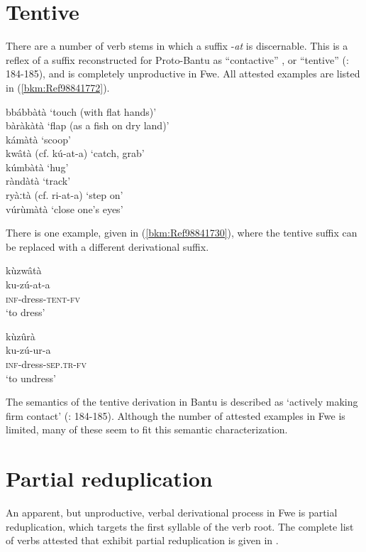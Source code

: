 \section{Tentive}
\label{bkm:Ref485997273}\hypertarget{Toc75352670}{}
There are a number of verb stems in which a suffix -\textit{at} is discernable. This is a reflex of a suffix reconstructed for Proto-Bantu as “contactive” \citep[92]{Meeussen1967}, or “tentive” (\citealt{SchadebergBostoen2019}: 184-185), and is completely unproductive in Fwe. All attested examples are listed in (\ref{bkm:Ref98841772}).

\ea
\label{bkm:Ref98841772}
bbábbàtà \tab ‘touch (with flat hands)’\\
bàràkàtà \tab ‘flap (as a fish on dry land)’\\
kámàtà \tab ‘scoop’\\
kwâtà (cf. kú-at-a) \tab ‘catch, grab’\\
kúmbàtà \tab ‘hug’\\
ràndàtà \tab ‘track’\\
ryàːtà (cf. ri-at-a) \tab ‘step on’\\
vúrùmàtà \tab ‘close one’s eyes’\\
\z


There is one example, given in (\ref{bkm:Ref98841730}), where the tentive suffix can be replaced with a different derivational suffix.

\ea
\label{bkm:Ref98841730}
\glll kùzwâtà\\
ku-zú-at-a\\
\textsc{inf}-dress-\textsc{tent}-\textsc{fv}\\
\glt ‘to dress’
\z

\ea
\glll kùzûrà\\
ku-zú-ur-a\\
\textsc{inf}-dress-\textsc{sep}.\textsc{tr}-\textsc{fv}\\
\glt ‘to undress’
\z

The semantics of the tentive derivation in Bantu is described as ‘actively making firm contact’ (\citealt{SchadebergBostoen2019}: 184-185). Although the number of attested examples in Fwe is limited, many of these seem to fit this semantic characterization.

\section{Partial reduplication}
\hypertarget{Toc75352671}{}\label{bkm:Ref98773057}
An apparent, but unproductive, verbal derivational process in Fwe is partial reduplication, which targets the first syllable of the verb root. The complete list of verbs attested that exhibit partial reduplication is given in .

